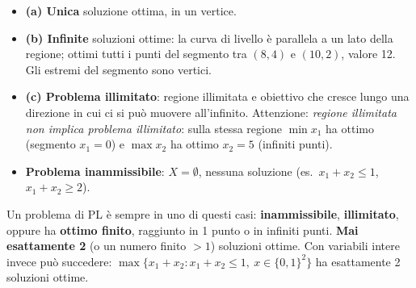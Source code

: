 \begin{center}
\end{center}
\begin{itemize}[nosep]
\item \textbf{(a) Unica} soluzione ottima, in un vertice.
\item \textbf{(b) Infinite} soluzioni ottime: la curva di livello è parallela a un lato della regione; ottimi tutti i punti del segmento tra $(8,4)$ e $(10,2)$, valore 12. Gli estremi del segmento sono vertici.
\item \textbf{(c) Problema illimitato}: regione illimitata e obiettivo che cresce lungo una direzione in cui ci si può muovere all'infinito. Attenzione: \emph{regione illimitata non implica problema illimitato}: sulla stessa regione $\min x_1$ ha ottimo (segmento $x_1=0$) e $\max x_2$ ha ottimo $x_2=5$ (infiniti punti).
\item \textbf{Problema inammissibile}: $X=\emptyset$, nessuna soluzione (es.\ $x_1+x_2\le1$, $x_1+x_2\ge2$).
\end{itemize}
\begin{esame}
Un problema di PL è sempre in uno di questi casi: \textbf{inammissibile}, \textbf{illimitato}, oppure ha \textbf{ottimo finito}, raggiunto in 1 punto o in infiniti punti. \textbf{Mai esattamente 2} (o un numero finito $>1$) soluzioni ottime. Con variabili intere invece può succedere: $\max\{x_1+x_2: x_1+x_2\le1,\ x\in\{0,1\}^2\}$ ha esattamente 2 soluzioni ottime.
\end{esame}

